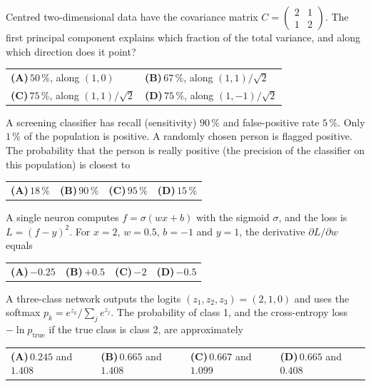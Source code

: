 \documentclass[11pt,a4paper]{article}
\newcommand{\optlabel}[1]{\textbf{(#1)}}
\newenvironment{qitem}[1]{\begin{list}{}{\setlength{\leftmargin}{3.3em}\setlength{\labelwidth}{3.1em}%
  \setlength{\labelsep}{0.2em}\setlength{\topsep}{3pt}\setlength{\parsep}{3pt}}\item[\textbf{Q.#1}\hfill]}{\end{list}}
\newcommand{\qsep}{\par\vspace{2pt}{\color{black!15}\hrule}\vspace{4pt}}
\begin{document}
\begin{qitem}{4}
Centred two-dimensional data have the covariance matrix $C = \begin{pmatrix}2 & 1\\ 1 & 2\end{pmatrix}$. The first
principal component explains which fraction of the total variance, and along which direction does it point?
\par\smallskip\noindent\begin{tabularx}{\linewidth}{@{}*{2}{L}@{}}
\optlabel{A}\,$50\,\%$, along $(1, 0)$ & \optlabel{B}\,$67\,\%$, along $(1, 1)/\sqrt2$ \\[3pt]
\optlabel{C}\,$75\,\%$, along $(1, 1)/\sqrt2$ & \optlabel{D}\,$75\,\%$, along $(1, -1)/\sqrt2$
\end{tabularx}
\end{qitem}
\qsep

\begin{qitem}{5}
A screening classifier has recall (sensitivity) $90\,\%$ and false-positive rate $5\,\%$. Only $1\,\%$ of the
population is positive. A randomly chosen person is flagged positive. The probability that the person is really positive
(the precision of the classifier on this population) is closest to
\par\smallskip\noindent\begin{tabularx}{\linewidth}{@{}*{4}{L}@{}}
\optlabel{A}\,$18\,\%$ & \optlabel{B}\,$90\,\%$ & \optlabel{C}\,$95\,\%$ & \optlabel{D}\,$15\,\%$
\end{tabularx}
\end{qitem}
\qsep

\begin{qitem}{6}
A single neuron computes $f = \sigma(wx + b)$ with the sigmoid $\sigma$, and the loss is $L = (f - y)^2$.
For $x = 2$, $w = 0.5$, $b = -1$ and $y = 1$, the derivative $\partial L/\partial w$ equals
\par\smallskip\noindent\begin{tabularx}{\linewidth}{@{}*{4}{L}@{}}
\optlabel{A}\,$-0.25$ & \optlabel{B}\,$+0.5$ & \optlabel{C}\,$-2$ & \optlabel{D}\,$-0.5$
\end{tabularx}
\end{qitem}
\qsep

\begin{qitem}{7}
A three-class network outputs the logits $(z_1, z_2, z_3) = (2, 1, 0)$ and uses the softmax
$p_k = e^{z_k}/\sum_j e^{z_j}$. The probability of class 1, and the cross-entropy loss $-\ln p_{\text{true}}$ if the true
class is class 2, are approximately
\par\smallskip\noindent\begin{tabularx}{\linewidth}{@{}*{4}{L}@{}}
\optlabel{A}\,$0.245$ and $1.408$ & \optlabel{B}\,$0.665$ and $1.408$ & \optlabel{C}\,$0.667$ and $1.099$ & \optlabel{D}\,$0.665$ and $0.408$
\end{tabularx}
\end{qitem}
\qsep
\end{document}
